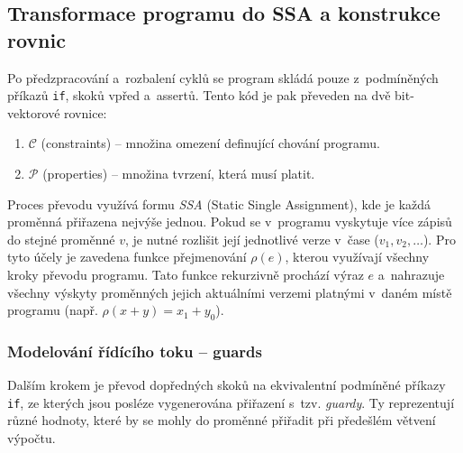 \documentclass[a4paper, 11pt]{article}
\begin{document}
\subsection{Transformace programu do SSA a konstrukce rovnic}\label{sec:CBMC_Desc_SSATransformation}
Po předzpracování a~rozbalení cyklů se program skládá pouze z~podmíněných příkazů \texttt{if}, skoků vpřed a~assertů.
Tento kód je pak převeden na dvě bit-vektorové rovnice:
\begin{enumerate}
    \item $\mathcal{C}$ (constraints) -- množina omezení definující chování programu.
    \item $\mathcal{P}$ (properties) -- množina tvrzení, která musí platit.
\end{enumerate}

Proces převodu využívá formu \emph{SSA} (Static Single Assignment), kde je každá proměnná přiřazena nejvýše jednou.
Pokud se v~programu vyskytuje více zápisů do stejné proměnné $v$, je nutné rozlišit její jednotlivé verze v~čase ($v_1, v_2, \dots$).
Pro tyto účely je zavedena funkce přejmenování $\rho(e)$, kterou využívají všechny kroky převodu programu.
Tato funkce rekurzivně prochází výraz $e$ a~nahrazuje všechny výskyty proměnných jejich aktuálními verzemi platnými v~daném místě programu (např. $\rho(x + y) = x_1 + y_0$).


\subsubsection{Modelování řídícího toku -- guards}

Dalším krokem je převod dopředných skoků na ekvivalentní podmíněné příkazy \texttt{if}, ze kterých jsou posléze vygenerována přiřazení s~tzv. \emph{guardy}.
Ty reprezentují různé hodnoty, které by se mohly do proměnné přiřadit při předešlém větvení výpočtu.
\end{document}
